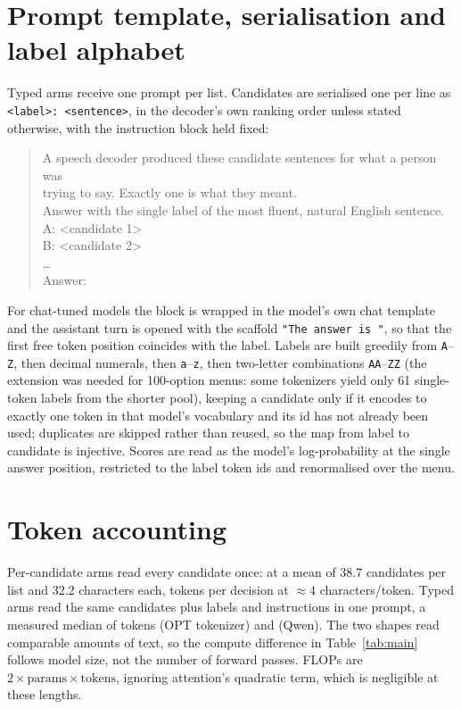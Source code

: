\documentclass[11pt]{article}
\begin{document}
\appendix

\section{Prompt template, serialisation and label alphabet}
\label{app:prompt}

Typed arms receive one prompt per list. Candidates are serialised one per line as
\texttt{<label>: <sentence>}, in the decoder's own ranking order unless stated otherwise,
with the instruction block held fixed:

\begin{quote}\small\ttfamily
A speech decoder produced these candidate sentences for what a person was\\
trying to say. Exactly one is what they meant.\\
Answer with the single label of the
most fluent, natural English sentence.\\[2pt]
A: <candidate 1>\\
B: <candidate 2>\\
\ldots\\[2pt]
Answer:
\end{quote}

For chat-tuned models the block is wrapped in the model's own chat template and the
assistant turn is opened with the scaffold \texttt{"The answer is "}, so that the first free
token position coincides with the label. Labels are built greedily from
\texttt{A}--\texttt{Z}, then decimal numerals, then \texttt{a}--\texttt{z}, then two-letter
combinations \texttt{AA}--\texttt{ZZ} (the extension was needed for 100-option menus: some
tokenizers yield only 61 single-token labels from the shorter pool), keeping a
candidate only if it encodes to exactly one token in that model's vocabulary and its id has
not already been used; duplicates are skipped rather than reused, so the map from label to
candidate is injective. Scores are read as the model's log-probability at the single answer
position, restricted to the label token ids and renormalised over the menu.

\section{Token accounting}
\label{app:tokens}

Per-candidate arms read every candidate once: at a mean of 38.7 candidates per list and
32.2 characters each, \tokPerCand{} tokens per decision at $\approx$4 characters/token.
Typed arms read the same candidates plus labels and instructions in one prompt, a measured
median of \tokTypedOpt{} tokens (OPT tokenizer) and \tokTypedQwen{} (Qwen). The two
shapes read comparable amounts of text, so the compute difference in Table~\ref{tab:main}
follows model size, not the number of forward passes. FLOPs are
$2 \times \text{params} \times \text{tokens}$, ignoring attention's quadratic term,
which is negligible at these lengths.
\end{document}
